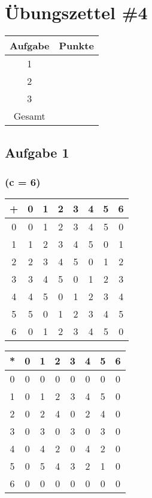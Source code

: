 \documentclass{article}
\begin{document}
\section*{Übungszettel \#4} %

\begin{center}
    \begin{tabular}{|c|c|}
        \hline
        Aufgabe & Punkte \\
        \hline
        1 & \\
        2 & \\
        3 & \\
        \hline
        Gesamt & \\
        \hline
    \end{tabular}
\end{center}

\subsection*{Aufgabe 1}
\subsubsection*{(c = 6)}
\begin{center}
    \begin{tabular}{c|ccccccc}
        + & 0 & 1 & 2 & 3 & 4 & 5 & 6 \\
        \hline
        0 & 0 & 1 & 2 & 3 & 4 & 5 & 0 \\
        1 & 1 & 2 & 3 & 4 & 5 & 0 & 1 \\
        2 & 2 & 3 & 4 & 5 & 0 & 1 & 2 \\
        3 & 3 & 4 & 5 & 0 & 1 & 2 & 3 \\
        4 & 4 & 5 & 0 & 1 & 2 & 3 & 4 \\
        5 & 5 & 0 & 1 & 2 & 3 & 4 & 5 \\
        6 & 0 & 1 & 2 & 3 & 4 & 5 & 0 \\
    \end{tabular}    
\end{center} 
\begin{center}
    \begin{tabular}{c|ccccccc}
        * & 0 & 1 & 2 & 3 & 4 & 5 & 6 \\
        \hline
        0 & 0 & 0 & 0 & 0 & 0 & 0 & 0 \\
        1 & 0 & 1 & 2 & 3 & 4 & 5 & 0 \\
        2 & 0 & 2 & 4 & 0 & 2 & 4 & 0 \\
        3 & 0 & 3 & 0 & 3 & 0 & 3 & 0 \\
        4 & 0 & 4 & 2 & 0 & 4 & 2 & 0 \\
        5 & 0 & 5 & 4 & 3 & 2 & 1 & 0 \\
        6 & 0 & 0 & 0 & 0 & 0 & 0 & 0 \\
    \end{tabular}
\end{center}
\end{document}
